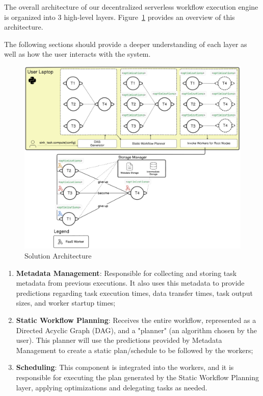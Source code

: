 \documentclass[conference]{IEEEtran}
\begin{document}
The overall architecture of our decentralized serverless workflow execution engine is organized into 3 high-level layers. Figure~\ref{fig:solution_architecture} provides an overview of this architecture.

The following sections should provide a deeper understanding of each layer as well as how the user interacts with the system.

\begin{figure}[h]
  \centering
  \includegraphics[width=\columnwidth]{figures/solution_distributedarchintegrated.png}
  \caption{Solution Architecture}
  \label{fig:solution_architecture}
\end{figure}

\begin{enumerate}
    \item \textbf{Metadata Management}: Responsible for collecting and storing task metadata from previous executions. It also uses this metadata to provide predictions regarding task execution times, data transfer times, task output sizes, and worker startup times;
    \item \textbf{Static Workflow Planning}: Receives the entire workflow, represented as a Directed Acyclic Graph (DAG), and a "planner" (an algorithm chosen by the user). This planner will use the predictions provided by Metadata Management to create a static plan/schedule to be followed by the workers;
    \item \textbf{Scheduling}: This component is integrated into the workers, and it is responsible for executing the plan generated by the Static Workflow Planning layer, applying optimizations and delegating tasks as needed.
\end{enumerate}
\end{document}
